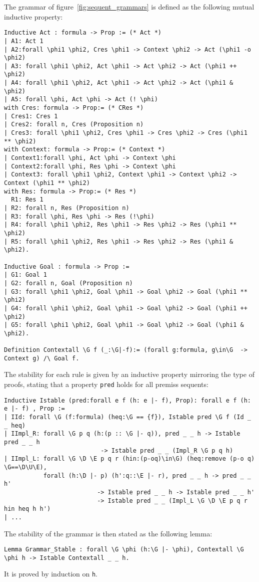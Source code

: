 \documentclass[runningheads,a4paper]{llncs}
\begin{document}
The grammar of figure~\ref{fig:sequent_grammars} is defined as the following
mutual inductive property:
\begin{lstlisting}
Inductive Act : formula -> Prop := (* Act *)
| A1: Act 1
| A2:forall \phi1 \phi2, Cres \phi1 -> Context \phi2 -> Act (\phi1 -o \phi2)
| A3: forall \phi1 \phi2, Act \phi1 -> Act \phi2 -> Act (\phi1 ++ \phi2)
| A4: forall \phi1 \phi2, Act \phi1 -> Act \phi2 -> Act (\phi1 & \phi2)
| A5: forall \phi, Act \phi -> Act (! \phi)
with Cres: formula -> Prop:= (* CRes *)
| Cres1: Cres 1
| Cres2: forall n, Cres (Proposition n)
| Cres3: forall \phi1 \phi2, Cres \phi1 -> Cres \phi2 -> Cres (\phi1 ** \phi2)
with Context: formula -> Prop:= (* Context *)
| Context1:forall \phi, Act \phi -> Context \phi
| Context2:forall \phi, Res \phi -> Context \phi
| Context3: forall \phi1 \phi2, Context \phi1 -> Context \phi2 -> Context (\phi1 ** \phi2)
with Res: formula -> Prop:= (* Res *)
  R1: Res 1
| R2: forall n, Res (Proposition n)
| R3: forall \phi, Res \phi -> Res (!\phi)
| R4: forall \phi1 \phi2, Res \phi1 -> Res \phi2 -> Res (\phi1 ** \phi2)
| R5: forall \phi1 \phi2, Res \phi1 -> Res \phi2 -> Res (\phi1 & \phi2).

Inductive Goal : formula -> Prop :=
| G1: Goal 1
| G2: forall n, Goal (Proposition n)
| G3: forall \phi1 \phi2, Goal \phi1 -> Goal \phi2 -> Goal (\phi1 ** \phi2)
| G4: forall \phi1 \phi2, Goal \phi1 -> Goal \phi2 -> Goal (\phi1 ++ \phi2)
| G5: forall \phi1 \phi2, Goal \phi1 -> Goal \phi2 -> Goal (\phi1 & \phi2).

Definition Contextall \G f (_:\G|-f):= (forall g:formula, g\in\G  -> Context g) /\ Goal f.
\end{lstlisting}



The stability for each rule is given by an inductive property mirroring the type
of proofs, stating that a property \texttt{pred} holds for all premiss sequents:

\begin{lstlisting}
Inductive Istable (pred:forall e f (h: e |- f), Prop): forall e f (h: e |- f) , Prop := 
| IId: forall \G (f:formula) (heq:\G == {f}), Istable pred \G f (Id _ _ heq)
| IImpl_R: forall \G p q (h:(p :: \G |- q)), pred _ _ h -> Istable pred _ _ h
                           -> Istable pred _ _ (Impl_R \G p q h)
| IImpl_L: forall \G \D \E p q r (hin:(p-oq)\in\G) (heq:remove (p-o q) \G==\D\U\E),
           forall (h:\D |- p) (h':q::\E |- r), pred _ _ h -> pred _ _ h'
                          -> Istable pred _ _ h -> Istable pred _ _ h'
                          -> Istable pred _ _ (Impl_L \G \D \E p q r hin heq h h')
| ...
\end{lstlisting}
The stability of the grammar is then stated as the following lemma:
\begin{lstlisting}
Lemma Grammar_Stable : forall \G \phi (h:\G |- \phi), Contextall \G \phi h -> Istable Contextall _ _ h.
\end{lstlisting}
It is proved by induction on \texttt{h}.
\end{document}
